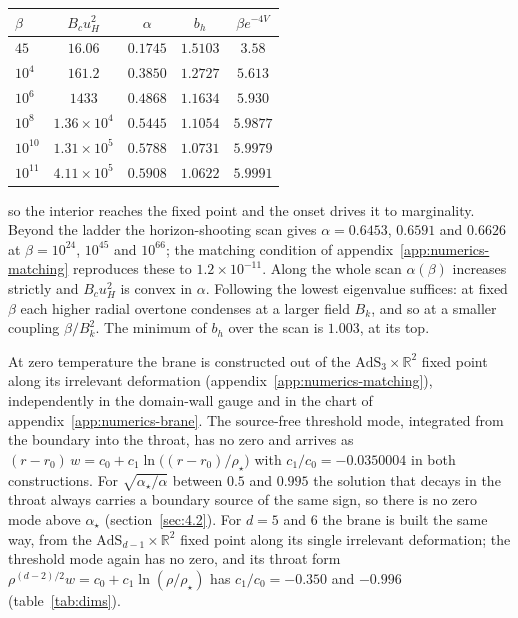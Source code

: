 \begin{center}
\begin{tabular}{lcccc}
\toprule
$\beta$ & $B_c u_H^2$ & $\alpha$ & $b_h$ & $\beta e^{-4V}$ \\
\midrule
$45$ & $16.06$ & $0.1745$ & $1.5103$ & $3.58$ \\
$10^4$ & $161.2$ & $0.3850$ & $1.2727$ & $5.613$ \\
$10^6$ & $1433$ & $0.4868$ & $1.1634$ & $5.930$ \\
$10^8$ & $1.36\times10^4$ & $0.5445$ & $1.1054$ & $5.9877$ \\
$10^{10}$ & $1.31\times10^5$ & $0.5788$ & $1.0731$ & $5.9979$ \\
$10^{11}$ & $4.11\times10^5$ & $0.5908$ & $1.0622$ & $5.9991$ \\
\bottomrule
\end{tabular}
\end{center}
so the interior reaches the fixed point and the onset drives it to
marginality. Beyond the ladder the horizon-shooting scan gives
$\alpha = 0.6453$, $0.6591$ and $0.6626$ at $\beta = 10^{24}$, $10^{45}$
and $10^{66}$; the matching condition of
appendix~\ref{app:numerics-matching} reproduces these to $1.2\times10^{-11}$. Along the whole scan $\alpha(\beta)$ increases strictly and
$B_c u_H^2$ is convex in $\alpha$. Following the lowest eigenvalue
suffices: at fixed $\beta$ each higher radial overtone condenses at a
larger field $B_k$, and so at a smaller coupling $\beta/B_k^2$. The minimum
of $b_h$ over the scan is $1.003$, at its top.

At zero temperature the brane is constructed out of the
$\mathrm{AdS}_3 \times \mathbb{R}^2$ fixed point along its irrelevant
deformation (appendix~\ref{app:numerics-matching}), independently in the
domain-wall gauge and in the chart of appendix~\ref{app:numerics-brane}.
The source-free threshold mode, integrated from the boundary into the
throat, has no zero and arrives as
$(r - r_0)\,w = c_0 + c_1\ln\big((r - r_0)/\rho_\star\big)$ with
$c_1/c_0 = -0.0350004$ in both constructions. For
$\sqrt{\alpha_\star/\alpha}$ between $0.5$ and $0.995$ the solution that
decays in the throat always carries a boundary source of the same sign, so
there is no zero mode above $\alpha_\star$ (section~\ref{sec:4.2}). For $d = 5$ and $6$ the brane is built the same way, from the
$\mathrm{AdS}_{d-1} \times \mathbb{R}^2$ fixed point along its single
irrelevant deformation; the threshold mode again has no zero, and its
throat form $\rho^{(d-2)/2}w = c_0 + c_1\ln(\rho/\rho_\star)$ has
$c_1/c_0 = -0.350$ and $-0.996$ (table~\ref{tab:dims}).

